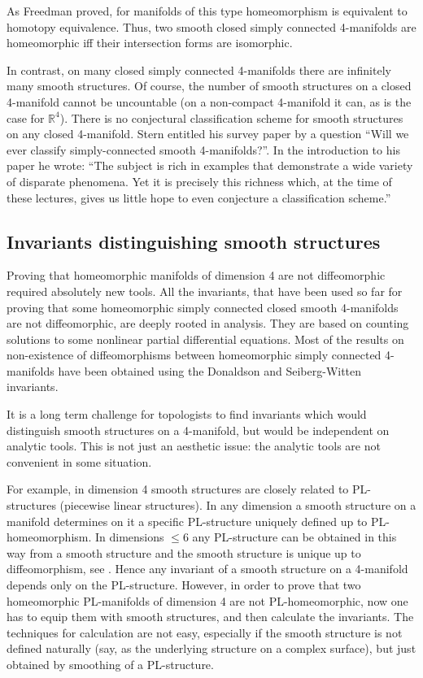 \documentclass{article}
\begin{document}
As Freedman \cite{F} proved, for manifolds of this type homeomorphism 
is equivalent to homotopy equivalence. Thus, two smooth closed simply connected 
4-manifolds are homeomorphic iff their intersection forms are isomorphic. 

In contrast, on many closed simply connected 4-manifolds there are 
infinitely many smooth structures. Of course, the number of smooth structures 
on a closed 4-manifold cannot be uncountable (on a non-compact 4-manifold it 
can, as is the case for $\mathbb R^4$). There is no conjectural classification 
scheme
for smooth structures on any closed 4-manifold. Stern entitled his survey  
paper \cite{Stern} by a question ``Will we ever classify simply-connected 
smooth 4-manifolds?''. In the introduction to his paper he wrote: ``The 
subject is rich in examples that demonstrate a wide variety of disparate 
phenomena. Yet it is precisely this richness which, at the time of these 
lectures, gives us little hope to even conjecture a classification scheme.'' 


\subsection{Invariants distinguishing smooth structures}
Proving that homeomorphic manifolds of dimension 4 are not diffeomorphic 
required absolutely new tools. All the invariants, 
that have been used so far for proving that some homeomorphic
simply connected closed smooth 4-manifolds are not diffeomorphic, 
are deeply rooted in analysis. They are based on counting solutions to some 
nonlinear partial differential equations. 
Most of the results on non-existence of 
diffeomorphisms between homeomorphic simply connected 4-manifolds have been 
obtained 
using the Donaldson and Seiberg-Witten invariants.

It is a long term challenge for topologists to find invariants which  
would distinguish smooth structures on a 4-manifold, but would be independent
on analytic tools. This is not just an aesthetic issue: the analytic 
tools are not convenient in some situation. 

For example, in dimension 4 smooth structures are closely related to 
PL-structures (piecewise linear structures). In any dimension a
smooth structure on a manifold determines on it a specific PL-structure 
uniquely defined up to PL-homeomorphism.
In dimensions $\le 6$ any PL-structure can be obtained in this way from a 
smooth structure and the smooth structure is unique up to diffeomorphism,
see \cite{S}. 
Hence any invariant of a smooth structure on a 4-manifold 
depends only on the PL-structure. However,  in order to prove that 
two homeomorphic PL-manifolds of dimension 4 are
not PL-homeomorphic, now one has to equip them with smooth 
structures, and then calculate the invariants. 
The techniques for calculation are not easy, especially if 
the smooth structure is not defined naturally (say, as the underlying 
structure on a complex surface), 
but just obtained by smoothing of a PL-structure. 
\end{document}
